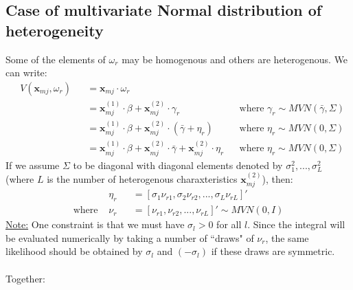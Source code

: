 \documentclass[12pt]{article}
\begin{document}
\subsection{Case of multivariate Normal distribution of heterogeneity}
Some of the elements of $\omega_r$ may be homogenous and others are heterogenous. We can write:
\begin{equation}
\begin{aligned}
	& V(\textbf{x}_{mj}, \omega_r) && = \textbf{x}_{mj} \cdot \omega_r \\
	& && = \textbf{x}^{(1)}_{mj} \cdot \beta + \textbf{x}^{(2)}_{mj} \cdot \gamma_r && \text{where } \gamma_r \sim MVN(\bar{\gamma}, \Sigma)  \\
	& && = \textbf{x}^{(1)}_{mj} \cdot \beta + \textbf{x}^{(2)}_{mj} \cdot (\bar{\gamma} + \eta_r) && \text{where } \eta_r \sim MVN(0, \Sigma)  \\
	& && = \textbf{x}^{(1)}_{mj} \cdot \beta + \textbf{x}^{(2)}_{mj} \cdot \bar{\gamma} + \textbf{x}^{(2)}_{mj} \cdot \eta_r && \text{where } \eta_r \sim MVN(0, \Sigma) 
\end{aligned}
\end{equation}
If we assume $\Sigma$ to be diagonal with diagonal elements denoted by $\sigma^2_1, ..., \sigma^2_L$ (where $L$ is the number of heterogenous charaxteristics $\textbf{x}^{(2)}_{mj}$), then: 
\begin{equation}
\begin{aligned}
	& \eta_r && = \left[ \sigma_1 \nu_{r1},  \sigma_2 \nu_{r2}, ...,  \sigma_L \nu_{rL} \right]' \\
	\text{where } & \nu_r && = \left[ \nu_{r1},  \nu_{r2}, ...,  \nu_{rL} \right]'  \sim MVN(0, I)
\end{aligned}
\end{equation}
\underline{Note:} One constraint is that we must have $\sigma_l > 0$ for all $l$. Since the integral will be evaluated numerically by taking a number of ``draws" of $\nu_r$, the same likelihood should be obtained by $\sigma_l$ and $(-\sigma_l)$ if these draws are symmetric.
\\
\\
Together:
\end{document}

